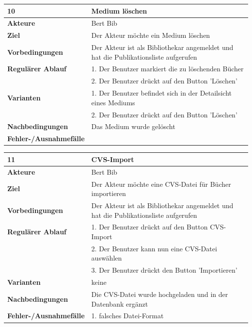 \documentclass[fontsize=12pt,paper=a4,twoside]{scrartcl}
\begin{document}
\begin{table}
	[H] \label{10} 
	\begin{tabular}
		{|l|p{10cm}|} \hline \textbf{10} & \textbf{Medium löschen} \\
		\hline \textbf{Akteure} & Bert Bib\\
		\hline \textbf{Ziel} & Der Akteur möchte ein Medium löschen \\
		\hline \textbf{Vorbedingungen} & Der Akteur ist als Bibliothekar angemeldet und hat die Publikationsliste aufgerufen \\
		\hline \textbf{Regulärer Ablauf} & 1. Der Benutzer markiert die zu löschenden Bücher\\
		&2. Der Benutzer drückt auf den Button 'Löschen' \\
		\hline \textbf{Varianten} & 1. Der Benutzer befindet sich in der Detailsicht eines Mediums\\
		&2. Der Benutzer drückt auf den Button 'Löschen' \\
		\hline \textbf{Nachbedingungen} & Das Medium wurde gelöscht \\
		\hline \textbf{Fehler-/Ausnahmefälle} & \\
		\hline 
	\end{tabular}
\end{table}
\begin{table}
	[H] \label{11} 
	\begin{tabular}
		{|l|p{10cm}|} \hline \textbf{11} & \textbf{CVS-Import} \\
		\hline \textbf{Akteure} & Bert Bib\\
		\hline \textbf{Ziel} & Der Akteur möchte eine CVS-Datei für Bücher importieren \\
		\hline \textbf{Vorbedingungen} & Der Akteur ist als Bibliothekar angemeldet und hat die Publikationsliste aufgerufen \\
		\hline \textbf{Regulärer Ablauf} & 1. Der Benutzer drückt auf den Button CVS-Import \\
		&2. Der Benutzer kann nun eine CVS-Datei auswählen\\
		&3. Der Benutzer drückt den Button 'Importieren'\\
		\hline \textbf{Varianten} & keine \\
		\hline \textbf{Nachbedingungen} & Die CVS-Datei wurde hochgeladen und in der Datenbank ergänzt\\\hline \textbf{Fehler-/Ausnahmefälle} & 1. falsches Datei-Format\\
		\hline 
	\end{tabular}
\end{table}
\end{document}
